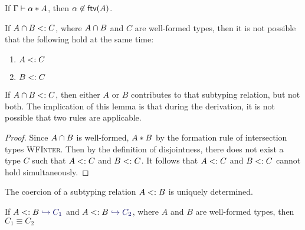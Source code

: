 \documentclass[nocopyrightspace,preprint,times,9pt]{sigplanconf}
\begin{document}
\begin{lemma} \label{free-var-disjoint-bounds}
  If $\Gamma \vdash \alpha * A$, then $\alpha \not \in \textsf{ftv}(A)$.
\end{lemma}

\begin{lemma} \label{unique-subtype-contributor}
If $A \cap B <: C$, where $A \cap B$ and $C$ are well-formed types, then it is not possible that the following hold at the same time:
\begin{enumerate}
\item $A <: C$
\item $B <: C$
\end{enumerate}
\end{lemma}

If $A \cap B <: C$, then either $A$ or $B$ contributes to that subtyping relation, but not both. The implication of this lemma is that during the derivation, it is not possible that two rules are applicable.

\newcommand{\wfinterlabel}{\textsc{WFInter}}

\begin{proof}
Since $A \cap B$ is well-formed, $A * B$ by the formation rule of intersection types \wfinterlabel. Then by the definition of disjointness, there does not exist a type $C$ such that $A <: C$ and $B <: C$. It follows that $A <: C$ and $B <: C$ cannot hold simultaneously.
\end{proof}

The coercion of a subtyping relation $A <: B$ is uniquely determined.

\begin{lemma} \label{unique-coercion}
If $A \subtype B \yields {C_1}$ and $A \subtype B \yields {C_2}$, where $A$ and $B$ are well-formed types, then $C_1 \equiv C_2$
\end{lemma}
\end{document}
